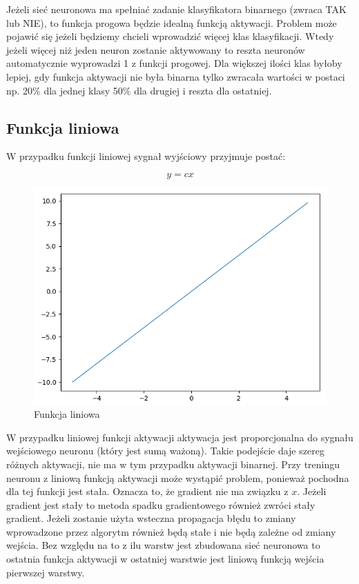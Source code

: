 Jeżeli sieć neuronowa ma spełniać zadanie klasyfikatora binarnego (zwraca TAK lub NIE), to funkcja progowa będzie idealną funkcją aktywacji. Problem może pojawić się jeżeli będziemy chcieli wprowadzić więcej klas klasyfikacji. Wtedy jeżeli więcej niż jeden neuron zostanie aktywowany to reszta neuronów automatycznie wyprowadzi 1 z funkcji progowej. Dla większej ilości klas byłoby lepiej, gdy funkcja aktywacji nie była binarna tylko zwracała wartości w postaci np. 20\% dla jednej klasy 50\% dla drugiej i reszta dla ostatniej.

\subsection{Funkcja liniowa}

W przypadku funkcji liniowej sygnał wyjściowy przyjmuje postać:

\begin{equation}
y = cx
\end{equation}

\begin{figure}[H]
	\centering
	\includegraphics[width=0.5\linewidth]{funkcjaLiniowa}
	\caption{Funkcja liniowa}
	\label{fig:funkcjaliniowa}
\end{figure}

W przypadku liniowej funkcji aktywacji aktywacja jest proporcjonalna do sygnału wejściowego neuronu (który jest sumą ważoną).
Takie podejście daje szereg różnych aktywacji, nie ma w tym przypadku aktywacji binarnej. Przy treningu neuronu z liniową funkcją aktywacji może wystąpić problem, ponieważ pochodna dla tej funkcji jest stała. Oznacza to, że gradient nie ma związku z $x$. Jeżeli gradient jest stały to metoda spadku gradientowego również zwróci stały gradient. Jeżeli zostanie użyta wsteczna propagacja błędu to zmiany wprowadzone przez algorytm również będą stałe i nie będą zależne od zmiany wejścia. Bez względu na to z ilu warstw jest zbudowana sieć neuronowa to ostatnia funkcja aktywacji w ostatniej warstwie jest liniową funkcją wejścia pierwszej warstwy.

